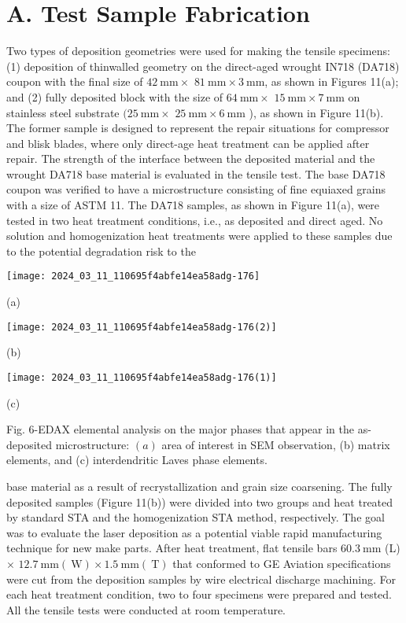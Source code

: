 \documentclass[10pt]{article}
\begin{document}
\section*{A. Test Sample Fabrication}
Two types of deposition geometries were used for making the tensile specimens: (1) deposition of thinwalled geometry on the direct-aged wrought IN718 (DA718) coupon with the final size of $42 \mathrm{~mm} \times$ $81 \mathrm{~mm} \times 3 \mathrm{~mm}$, as shown in Figures 11(a); and (2) fully deposited block with the size of $64 \mathrm{~mm} \times$ $15 \mathrm{~mm} \times 7 \mathrm{~mm}$ on stainless steel substrate $(25 \mathrm{~mm} \times$ $25 \mathrm{~mm} \times 6 \mathrm{~mm}$ ), as shown in Figure 11(b). The former sample is designed to represent the repair situations for compressor and blisk blades, where only direct-age heat treatment can be applied after repair. The strength of the interface between the deposited material and the wrought DA718 base material is evaluated in the tensile test. The base DA718 coupon was verified to have a microstructure consisting of fine equiaxed grains with a size of ASTM 11. The DA718 samples, as shown in Figure 11(a), were tested in two heat treatment conditions, i.e., as deposited and direct aged. No solution and homogenization heat treatments were applied to these samples due to the potential degradation risk to the

\begin{center}
\texttt{[image: 2024\_03\_11\_110695f4abfe14ea58adg-176]}
\end{center}

(a)

\begin{center}
\texttt{[image: 2024\_03\_11\_110695f4abfe14ea58adg-176(2)]}
\end{center}

(b)

\begin{center}
\texttt{[image: 2024\_03\_11\_110695f4abfe14ea58adg-176(1)]}
\end{center}

(c)

Fig. 6-EDAX elemental analysis on the major phases that appear in the as-deposited microstructure: $(a)$ area of interest in SEM observation, (b) matrix elements, and (c) interdendritic Laves phase elements.

base material as a result of recrystallization and grain size coarsening. The fully deposited samples (Figure 11(b)) were divided into two groups and heat treated by standard STA and the homogenization STA method, respectively. The goal was to evaluate the laser deposition as a potential viable rapid manufacturing technique for new make parts. After heat treatment, flat tensile bars $60.3 \mathrm{~mm}$ (L) $\times$ $12.7 \mathrm{~mm}(\mathrm{~W}) \times 1.5 \mathrm{~mm}(\mathrm{~T})$ that conformed to GE Aviation specifications were cut from the deposition samples by wire electrical discharge machining. For each heat treatment condition, two to four specimens were prepared and tested. All the tensile tests were conducted at room temperature.
\end{document}
